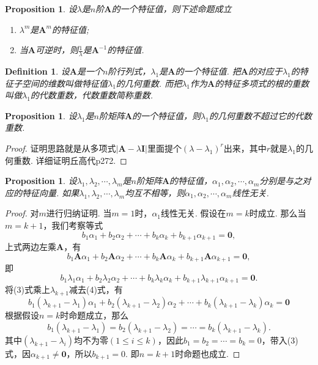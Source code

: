 \documentclass{article}
\newtheorem{proposition}[theorem]{Proposition}
\newtheorem{definition}[theorem]{Definition}
\newcommand{\mbf}[1]{\bm{#1}}
\begin{document}
\begin{proposition}
\rm 设$\lambda$是$n$阶$\mbf{A}$的一个特征值，则下述命题成立
\begin{enumerate}
	\item $\lambda^m$是$\mbf{A}^m$的特征值;
	\item 当$\mbf{A}$可逆时，则$\frac{1}{\lambda}$是$\mbf{A}^{-1}$的特征值.
\end{enumerate}
\end{proposition}

\begin{definition}
\rm 设$\mbf{A}$是一个$n$阶行列式，$\lambda_1$是$\mbf{A}$的一个特征值. 把$\mbf{A}$的对应于$\lambda_1$的特征子空间的维数叫做特征值$\lambda_1$的几何重数. 而把$\lambda_1$作为$\mbf{A}$的特征多项式的根的重数叫做$\lambda_1$的代数重数，代数重数简称重数.
\end{definition}

\begin{proposition}
\rm 设$\lambda_1$是$n$阶矩阵$\mbf{A}$的一个特征值，则$\lambda_
1$的几何重数不超过它的代数重数.
\end{proposition}

\begin{proof}
证明思路就是从多项式$|\mbf{A}-\lambda\mbf{I}|$里面提个$(\lambda-\lambda_1)^r$出来，其中$r$就是$\lambda_1$的几何重数. 详细证明丘高代p272.
\end{proof}

\begin{proposition}\label{characteristic: subspace-prop1}
\rm 设$\lambda_1,\lambda_2,\cdots,\lambda_m$是$n$阶矩阵$\mbf{A}$的特征值，$\alpha_1,\alpha_2,\cdots,\alpha_m$分别是与之对应的特征向量. 如果$\lambda_1,\lambda_2,\cdots,\lambda_m$均互不相等，则$\alpha_1,\alpha_2,\cdots,\alpha_m$线性无关.
\end{proposition}

\begin{proof}
对$m$进行归纳证明. 当$m=1$时，$\alpha_1$线性无关. 假设在$m=k$时成立. 那么当$m=k+1$，我们考察等式
\begin{equation}
b_1\alpha_1+b_2\alpha_2+\cdots+b_k\alpha_{k}+b_{k+1}\alpha_{k+1} = \mbf{0},
\end{equation}
上式两边左乘$\mbf{A}$，有
$$
b_1\mbf{A}\alpha_1+b_2\mbf{A}\alpha_2+\cdots+b_k\mbf{A}\alpha_{k}+b_{k+1}\mbf{A}\alpha_{k+1} = \mbf{0}, 
$$
即
\begin{equation}
b_1\lambda_1\alpha_1+b_2\lambda_2\alpha_2+\cdots+b_k\lambda_k\alpha_{k}+b_{k+1}\lambda_{k+1}\alpha_{k+1} = \mbf{0}.
\end{equation}
将(3)式乘上$\lambda_{k+1}$减去(4)式，有
$$
b_1(\lambda_{k+1}-\lambda_1)\alpha_1+b_2(\lambda_{k+1}-\lambda_2)\alpha_2+\cdots+b_k(\lambda_{k+1}-\lambda_k)\alpha_{k} = \mbf{0}
$$
根据假设$n=k$时命题成立，那么
$$
b_1(\lambda_{k+1}-\lambda_1) = b_2(\lambda_{k+1}-\lambda_2) =\cdots = b_k(\lambda_{k+1}-\lambda_k).
$$
其中$(\lambda_{k+1} - \lambda_i)$均不为零$(1\leq i \leq k)$，因此$b_1 = b_2 = \cdots = b_k = 0$，带入(3)式，因$\alpha_{k+1} \neq \mbf{0}$，所以$b_{k+1}=0$. 即$n = k+1$时命题也成立.  
\end{proof}
\end{document}
